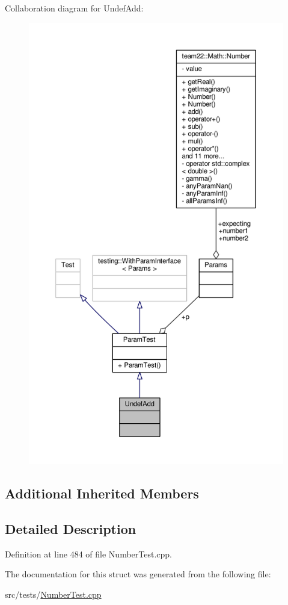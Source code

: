 Collaboration diagram for Undef\+Add\+:
\nopagebreak
\begin{figure}[H]
\begin{center}
\leavevmode
\includegraphics[height=550pt]{struct_undef_add__coll__graph}
\end{center}
\end{figure}
\subsection*{Additional Inherited Members}


\subsection{Detailed Description}


Definition at line 484 of file Number\+Test.\+cpp.



The documentation for this struct was generated from the following file\+:\begin{DoxyCompactItemize}
\item 
src/tests/\hyperlink{_number_test_8cpp}{Number\+Test.\+cpp}\end{DoxyCompactItemize}

